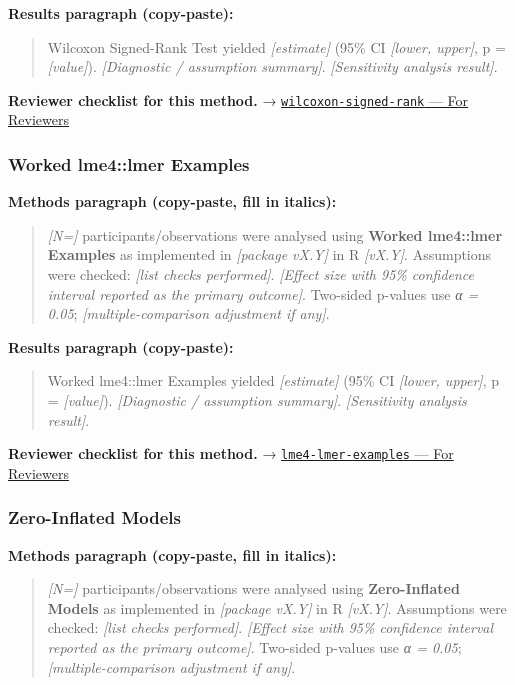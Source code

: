 \documentclass[
]{article}
\begin{document}
\textbf{Results paragraph (copy-paste):}

\begin{quote}
Wilcoxon Signed-Rank Test yielded \emph{{[}estimate{]}} (95\% CI
\emph{{[}lower, upper{]}}, p = \emph{{[}value{]}}). \emph{{[}Diagnostic
/ assumption summary{]}}. \emph{{[}Sensitivity analysis result{]}}.
\end{quote}

\textbf{Reviewer checklist for this method.} →
\href{../chapters/04-inferential/wilcoxon-signed-rank.Rmd\#for-reviewers}{\texttt{wilcoxon-signed-rank}
--- For Reviewers}

\subsubsection{Worked lme4::lmer
Examples}\label{worked-lme4lmer-examples}

\textbf{Methods paragraph (copy-paste, fill in italics):}

\begin{quote}
\emph{{[}N={]}} participants/observations were analysed using
\textbf{Worked lme4::lmer Examples} as implemented in \emph{{[}package
vX.Y{]}} in R \emph{{[}vX.Y{]}}. Assumptions were checked: \emph{{[}list
checks performed{]}}. \emph{{[}Effect size with 95\% confidence interval
reported as the primary outcome{]}}. Two-sided p-values use \emph{α =
0.05}; \emph{{[}multiple-comparison adjustment if any{]}}.
\end{quote}

\textbf{Results paragraph (copy-paste):}

\begin{quote}
Worked lme4::lmer Examples yielded \emph{{[}estimate{]}} (95\% CI
\emph{{[}lower, upper{]}}, p = \emph{{[}value{]}}). \emph{{[}Diagnostic
/ assumption summary{]}}. \emph{{[}Sensitivity analysis result{]}}.
\end{quote}

\textbf{Reviewer checklist for this method.} →
\href{../chapters/07-regression/lme4-lmer-examples.Rmd\#for-reviewers}{\texttt{lme4-lmer-examples}
--- For Reviewers}

\subsubsection{Zero-Inflated Models}\label{zero-inflated-models}

\textbf{Methods paragraph (copy-paste, fill in italics):}

\begin{quote}
\emph{{[}N={]}} participants/observations were analysed using
\textbf{Zero-Inflated Models} as implemented in \emph{{[}package
vX.Y{]}} in R \emph{{[}vX.Y{]}}. Assumptions were checked: \emph{{[}list
checks performed{]}}. \emph{{[}Effect size with 95\% confidence interval
reported as the primary outcome{]}}. Two-sided p-values use \emph{α =
0.05}; \emph{{[}multiple-comparison adjustment if any{]}}.
\end{quote}
\end{document}
